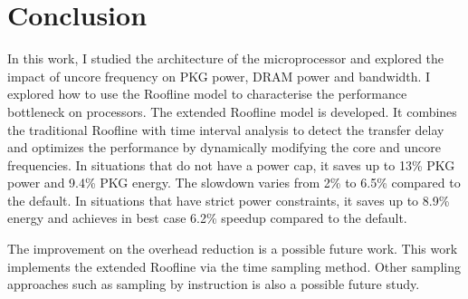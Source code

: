 \chapter{Conclusion}

In this work, I studied the architecture of the microprocessor and explored the impact of uncore frequency on PKG power, DRAM power and bandwidth. I explored how to use the Roofline model to characterise the performance bottleneck on  processors. The extended Roofline model is developed. It combines the traditional Roofline with time interval analysis to detect the transfer delay and optimizes the performance by dynamically modifying the core and uncore frequencies. In situations that do not have a power cap, it saves up to 13\% PKG power and 9.4\% PKG energy. The slowdown varies from 2\% to 6.5\% compared to the default. In situations that have strict power constraints, it saves up to 8.9\% energy and achieves in best case 6.2\% speedup compared to the default.

The improvement on the overhead reduction is a possible future work. This work implements the extended Roofline via the time sampling method. Other sampling approaches such as sampling by instruction is also a possible future study. 

